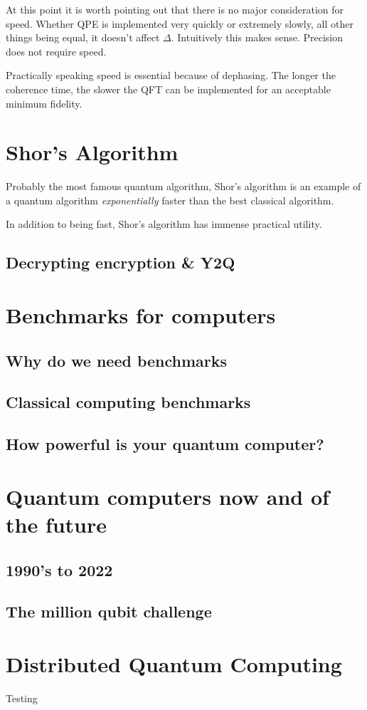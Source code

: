 \documentclass{book}
\begin{document}
At this point it is worth pointing out that there is no major consideration for speed. Whether QPE is implemented very quickly or extremely slowly, all other things being equal, it doesn't affect $\Delta $. Intuitively this makes sense. Precision does not require speed. 

Practically speaking speed is essential because of dephasing. The longer the coherence time, the slower the QFT can be implemented for an acceptable minimum fidelity. 

\chapter{Shor's Algorithm}

Probably the most famous quantum algorithm, Shor's algorithm is an example of a quantum algorithm \textit{exponentially} faster than the best classical algorithm. 

In addition to being fast, Shor's algorithm has immense practical utility. 

\section{Decrypting encryption \& Y2Q}

\chapter{Benchmarks for computers}

\section{Why do we need benchmarks}

\section{Classical computing benchmarks}

\section{How powerful is your quantum computer?}

\chapter{Quantum computers now and of the future}

\section{1990's to 2022}

\section{The million qubit challenge}

\chapter{Distributed Quantum Computing}


Testing
\end{document}
